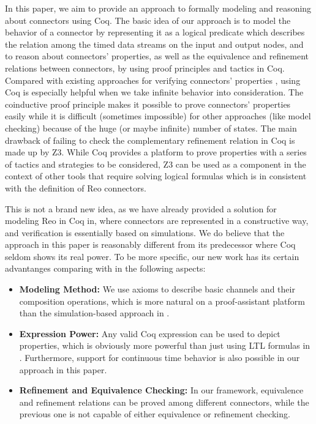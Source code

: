 \documentclass[3p,times]{elsarticle}
\begin{document}
In this paper, we aim to provide an approach to formally modeling and reasoning about connectors using Coq.
The basic idea of our
approach is to model the behavior of a connector by representing it as a logical predicate which describes the relation among
the timed data streams on the input and output nodes, and to reason about connectors' properties, as
well as the equivalence and refinement relations
between connectors, by using proof principles and tactics in Coq.
Compared with existing approaches for verifying connectors' properties \cite{BBK+10,KB09,KKV12}, using Coq is especially helpful when
we take infinite behavior into consideration. The coinductive proof principle makes it possible to prove connectors' properties easily while it
is difficult (sometimes impossible) for other approaches (like model checking) because of the huge (or maybe infinite) number of states. The main drawback of failing to check the complementary refinement relation in Coq is made up by Z3.
While Coq provides a platform to prove properties with a series of tactics and strategies to be considered, Z3 can be used as a component in the context of other tools that require solving logical formulas which is in consistent with the definition of Reo connectors.

This is not a brand new idea, as we have already provided a solution for modeling Reo in Coq in\cite{LS15}, where connectors are represented in a constructive way, and
verification is essentially based on simulations. We do believe that the approach in this paper is reasonably different from
its predecessor where Coq seldom shows its real power. To be more specific, our new work has its certain
advantanges comparing with \cite{LS15} in the following
aspects:
\begin{itemize}
\item {\bf Modeling Method:} We use axioms to describe basic channels and their composition operations, which is more natural on a proof-assistant
platform than the simulation-based approach in \cite{LS15}.
\item {\bf Expression Power:} Any valid Coq expression can be used to depict properties, which is obviously more powerful than just using LTL formulas in
\cite{LS15}. Furthermore, support for continuous time behavior is also
possible in our approach in this paper.
\item {\bf Refinement and Equivalence Checking:} In our framework, equivalence and refinement relations can be proved among different connectors, while the previous one is not capable of either equivalence or refinement checking.
\end{itemize}
\end{document}
